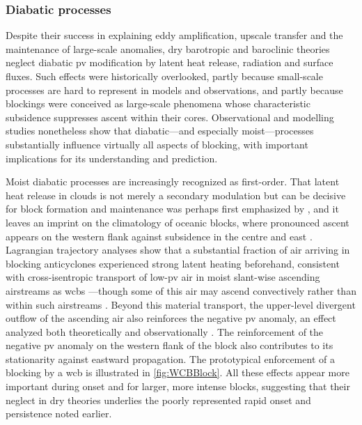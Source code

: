 \subsubsection{Diabatic processes} \label{sec:intro_block_diabatic}
Despite their success in explaining eddy amplification, upscale transfer and
the maintenance of large-scale anomalies, dry barotropic and baroclinic
theories neglect diabatic \gls{pv} modification by latent heat release,
radiation and surface fluxes. Such effects were historically overlooked,
partly because small-scale processes are hard to represent in models and
observations, and partly because blockings were conceived as large-scale
phenomena whose characteristic subsidence suppresses ascent within their
cores. Observational and modelling studies nonetheless show that
diabatic---and especially moist---processes substantially influence
virtually all aspects of blocking, with important implications for its
understanding and prediction.

Moist diabatic processes are increasingly recognized as
first-order. That latent heat release in clouds is not merely a secondary
modulation but can be decisive for block formation and maintenance was
perhaps first emphasized by \textcite{croci-maspoliKeyDynamicalFeatures2009,
    archambaultRelationshipsLargescaleRegime2010},
and it leaves an imprint on the climatology of oceanic blocks, where
pronounced ascent appears on the western flank against subsidence in the
centre and east \parencite{nabizadeh3DStructureNorthern2021}. Lagrangian
trajectory analyses show that a substantial fraction of air arriving in
blocking anticyclones experienced strong latent heating beforehand,
consistent with cross-isentropic transport of low-\gls{pv} air in moist
slant-wise ascending airstreams as \glspl{wcb} \parencite{pfahlImportanceLatentHeat2015,
    steinfeldRoleLatentHeating2019}---though some of this air may ascend
convectively rather than within such airstreams
\parencite{zschenderleinLagrangianAnalysisUppertropospheric2020}. Beyond this
material transport, the upper-level divergent outflow of the ascending air
also reinforces the negative \gls{pv} anomaly, an effect analyzed both
theoretically and observationally
\parencite{saffinCirculationConservationOutflow2021,
    methvenPotentialVorticityWarm2015}. The reinforcement of the negative
\gls{pv} anomaly on the western flank of the block also contributes to its
stationarity against eastward propagation. The prototypical enforcement of
a blocking by a \gls{wcb} is illustrated in \cref{fig:WCBBlock}.
All these effects appear more
important
during onset and for larger, more intense blocks, suggesting that their
neglect in dry theories underlies the poorly represented rapid onset and
persistence noted earlier.

